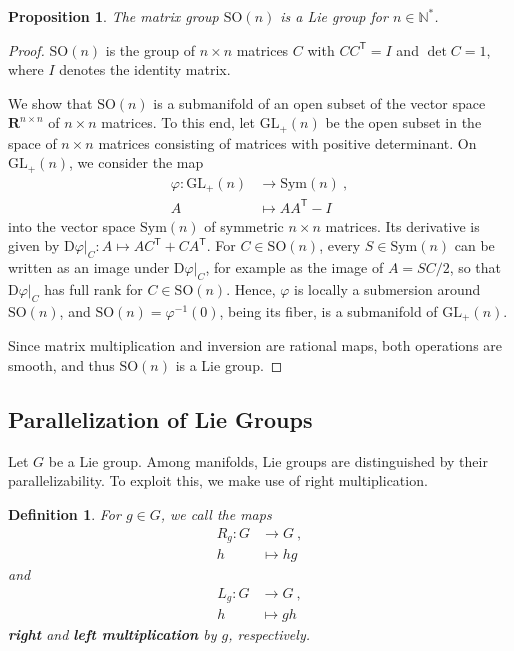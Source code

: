 \documentclass[10pt,a4paper]{article}
\theoremstyle{mytheorem}
\newtheorem{proposition}[theorem]{Proposition}
\theoremstyle{mydefinition}
\newtheorem{definition}[theorem]{Definition}
\newcommand{\mydef}[1]{\textbf{\textit{#1}}}
\newcommand{\trans}{^\mathsf{T}}
\newcommand{\Dt}{\mathrm{D}}
\newcommand{\SO}{\mathrm{SO}}
\begin{document}
\begin{proposition}
\label{th:SO3}
The matrix group $\SO(n)$ is a Lie group for $n\in\mathbb{N}^*$.
\end{proposition}
\begin{proof}
$\SO(n)$ is the group of $n\times n$ matrices $C$ with $CC\trans=I$ and $\det C=1$, where $I$ denotes the identity matrix.

We show that $\SO(n)$ is a submanifold of an open subset of the vector space $\mathbf{R}^{n\times n}$ of $n\times n$ matrices.
To this end, let $\mathrm{GL}_+(n)$ be the open subset in the space of $n\times n$ matrices consisting of matrices with positive determinant.
On $\mathrm{GL}_+(n)$, we consider the map
\begin{align*}
	\varphi: 
	\mathrm{GL}_+(n) &\rightarrow \mathrm{Sym}(n)
	\ ,\nonumber\\
	A &\mapsto AA\trans - I
\end{align*}
into the vector space $\mathrm{Sym}(n)$ of symmetric $n\times n$ matrices.
Its derivative is given by $\Dt\varphi|_C: A\mapsto AC\trans + CA\trans$.
For $C\in\SO(n)$, every $S\in\mathrm{Sym}(n)$ can be written as an image under $\Dt\varphi|_C$, for example as the image of $A=SC/2$, so that $\Dt\varphi|_C$ has full rank for $C\in\SO(n)$.
Hence, $\varphi$ is locally a submersion around $\SO(n)$, and $\SO(n)=\varphi^{-1}(0)$, being its fiber, is a submanifold of $\mathrm{GL}_+(n)$.

Since matrix multiplication and inversion are rational maps, both operations are smooth, and thus $\SO(n)$ is a Lie group.
\end{proof}

\subsection{Parallelization of Lie Groups}

Let $G$ be a Lie group.
Among manifolds, Lie groups are distinguished by their parallelizability.
To exploit this, we make use of right multiplication.

\begin{definition}
For $g\in G$, we call the maps
\begin{align*}
	R_g: G &\rightarrow G
	\ ,\nonumber\\
	h &\mapsto hg
\end{align*}
and
\begin{align*}
	L_g: G &\rightarrow G
	\ ,\nonumber\\
	h &\mapsto gh
\end{align*}
\mydef{right} and \mydef{left multiplication} by $g$, respectively.
\end{definition}
\end{document}
